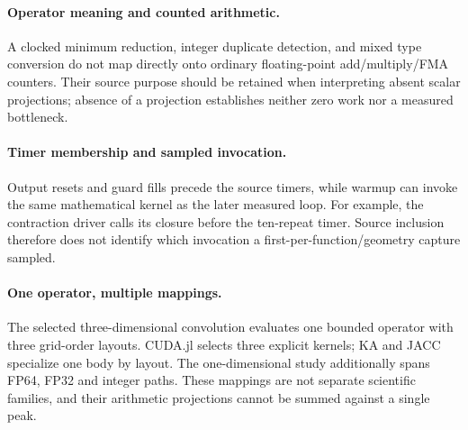 \paragraph{Operator meaning and counted arithmetic.}
A clocked minimum reduction, integer duplicate detection, and mixed type conversion do not map directly onto ordinary floating-point add/multiply/FMA counters. Their source purpose should be retained when interpreting absent scalar projections; absence of a projection establishes neither zero work nor a measured bottleneck.
\paragraph{Timer membership and sampled invocation.}
Output resets and guard fills precede the source timers, while warmup can invoke the same mathematical kernel as the later measured loop. For example, the contraction driver calls its closure before the ten-repeat timer. Source inclusion therefore does not identify which invocation a first-per-function/geometry capture sampled.
\paragraph{One operator, multiple mappings.}
The selected three-dimensional convolution evaluates one bounded operator with three grid-order layouts. CUDA.jl selects three explicit kernels; KA and JACC specialize one body by layout. The one-dimensional study additionally spans FP64, FP32 and integer paths. These mappings are not separate scientific families, and their arithmetic projections cannot be summed against a single peak.
